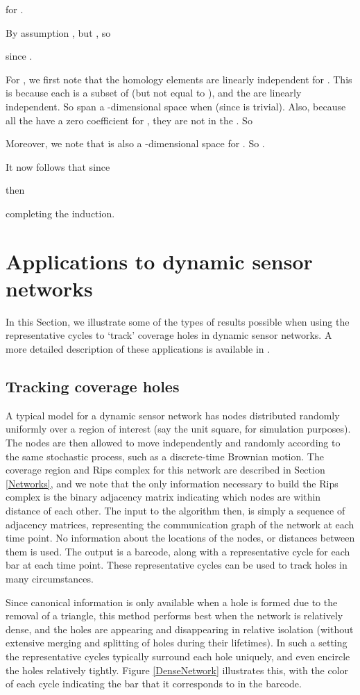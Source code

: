 \documentclass[12pt]{article}
\begin{document}
for .

By assumption , but , so

since .

For , we first note that the homology elements  are linearly independent for . This is because each  is a subset of  (but not equal to ), and the  are linearly independent. So  span a -dimensional space when  (since  is trivial). Also, because all the  have a zero coefficient for , they are not in the . So

Moreover, we note that  is also a -dimensional space for . So .

It now follows that since

then

completing the induction.

\section{Applications to dynamic sensor networks}\label{Examples}

In this Section, we illustrate some of the types of results possible when using the representative cycles to `track' coverage holes in dynamic sensor networks. A more detailed description of these applications is available in \cite{Gamble2014b}.

\subsection{Tracking coverage holes}

A typical model for a dynamic sensor network has  nodes distributed randomly uniformly over a region of interest (say the unit square, for simulation purposes). The nodes are then allowed to move independently and randomly according to the same stochastic process, such as a discrete-time Brownian motion. The coverage region and Rips complex for this network are described in Section \ref{Networks}, and we note that the only information necessary to build the Rips complex is the binary adjacency matrix indicating which nodes are within distance  of each other. The input to the algorithm then, is simply a sequence of adjacency matrices, representing the communication graph of the network at each time point. No information about the locations of the nodes, or distances between them is used. The output is a barcode, along with a representative cycle for each bar at each time point. These representative cycles can be used to track holes in many circumstances.

Since canonical information is only available when a hole is formed due to the removal of a triangle, this method performs best when the network is relatively dense, and the holes are appearing and disappearing in relative isolation (without extensive merging and splitting of holes during their lifetimes). In such a setting the representative cycles typically surround each hole uniquely, and even encircle the holes relatively tightly. Figure \ref{DenseNetwork} illustrates this, with the color of each cycle indicating the bar that it corresponds to in the barcode.
\end{document}
